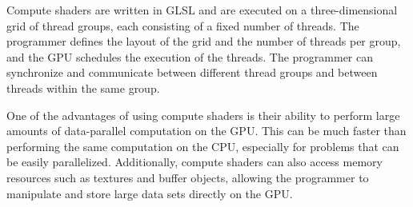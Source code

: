     Compute shaders are written in GLSL and are executed on a three-dimensional grid of thread groups, each consisting of a fixed number of threads. The programmer defines the layout of the grid and the number of threads per group, and the GPU schedules the execution of the threads. The programmer can synchronize and communicate between different thread groups and between threads within the same group.

    
    One of the advantages of using compute shaders is their ability to perform large amounts of data-parallel computation on the GPU. This can be much faster than performing the same computation on the CPU, especially for problems that can be easily parallelized. Additionally, compute shaders can also access memory resources such as textures and buffer objects, allowing the programmer to manipulate and store large data sets directly on the GPU.